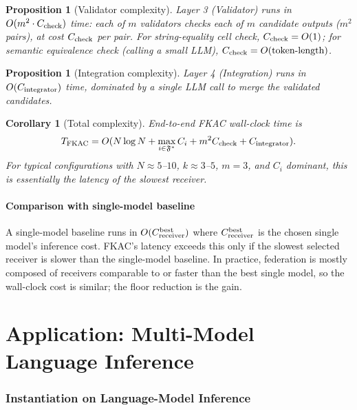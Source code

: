 \documentclass[11pt,twocolumn,a4paper]{article}
\newtheorem{proposition}[theorem]{Proposition}
\newtheorem{corollary}[theorem]{Corollary}
\theoremstyle{definition}
\theoremstyle{remark}
\newcommand{\Federation}{\mathfrak{F}}
\begin{document}
\begin{proposition}[Validator complexity]
\label{prop:val-comp}
Layer 3 (Validator) runs in $O(m^2 \cdot C_{\rm check})$ time: each of $m$ validators checks each of $m$ candidate outputs ($m^2$ pairs), at cost $C_{\rm check}$ per pair. For string-equality cell check, $C_{\rm check} = O(1)$; for semantic equivalence check (calling a small LLM), $C_{\rm check} = O(\text{token-length})$.
\end{proposition}

\begin{proposition}[Integration complexity]
\label{prop:int-comp}
Layer 4 (Integration) runs in $O(C_{\rm integrator})$ time, dominated by a single LLM call to merge the validated candidates.
\end{proposition}

\begin{corollary}[Total complexity]
\label{cor:total-comp}
End-to-end FKAC wall-clock time is
\[
T_{\rm FKAC} = O(N \log N + \max_{i \in \Federation^*} C_i + m^2 C_{\rm check} + C_{\rm integrator}).
\]
For typical configurations with $N \approx 5$--$10$, $k \approx 3$--$5$, $m = 3$, and $C_i$ dominant, this is essentially the latency of the slowest receiver.
\end{corollary}

\subsection{Comparison with single-model baseline}

A single-model baseline runs in $O(C_{\rm receiver}^{\rm best})$ where $C_{\rm receiver}^{\rm best}$ is the chosen single model's inference cost. FKAC's latency exceeds this only if the slowest selected receiver is slower than the single-model baseline. In practice, federation is mostly composed of receivers comparable to or faster than the best single model, so the wall-clock cost is similar; the floor reduction is the gain.


\part{Application: Multi-Model Language Inference}

\section{Instantiation on Language-Model Inference}
\label{sec:application}
\end{document}
